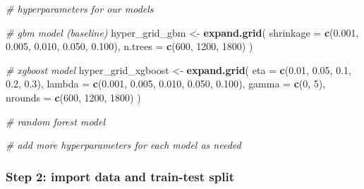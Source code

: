 \documentclass[
]{article}
\newenvironment{Shaded}{\begin{snugshade}}{\end{snugshade}}
\newcommand{\CommentTok}[1]{\textcolor[rgb]{0.56,0.35,0.01}{\textit{#1}}}
\newcommand{\DataTypeTok}[1]{\textcolor[rgb]{0.13,0.29,0.53}{#1}}
\newcommand{\DecValTok}[1]{\textcolor[rgb]{0.00,0.00,0.81}{#1}}
\newcommand{\FloatTok}[1]{\textcolor[rgb]{0.00,0.00,0.81}{#1}}
\newcommand{\KeywordTok}[1]{\textcolor[rgb]{0.13,0.29,0.53}{\textbf{#1}}}
\newcommand{\NormalTok}[1]{#1}
\newcommand{\OperatorTok}[1]{\textcolor[rgb]{0.81,0.36,0.00}{\textbf{#1}}}
\newcommand{\StringTok}[1]{\textcolor[rgb]{0.31,0.60,0.02}{#1}}
\begin{document}
\begin{Shaded}
\begin{Highlighting}[]
\CommentTok{# hyperparameters for our models }

\CommentTok{# gbm model (baseline)}
\NormalTok{hyper_grid_gbm <-}\StringTok{ }\KeywordTok{expand.grid}\NormalTok{(}
  \DataTypeTok{shrinkage =} \KeywordTok{c}\NormalTok{(}\FloatTok{0.001}\NormalTok{, }\FloatTok{0.005}\NormalTok{, }\FloatTok{0.010}\NormalTok{, }\FloatTok{0.050}\NormalTok{, }\FloatTok{0.100}\NormalTok{),}
  \DataTypeTok{n.trees =} \KeywordTok{c}\NormalTok{(}\DecValTok{600}\NormalTok{, }\DecValTok{1200}\NormalTok{, }\DecValTok{1800}\NormalTok{)}
\NormalTok{)}

\CommentTok{# xgboost model }
\NormalTok{hyper_grid_xgboost <-}\StringTok{ }\KeywordTok{expand.grid}\NormalTok{(}
  \DataTypeTok{eta =} \KeywordTok{c}\NormalTok{(}\FloatTok{0.01}\NormalTok{, }\FloatTok{0.05}\NormalTok{, }\FloatTok{0.1}\NormalTok{, }\FloatTok{0.2}\NormalTok{, }\FloatTok{0.3}\NormalTok{),}
  \DataTypeTok{lambda =} \KeywordTok{c}\NormalTok{(}\FloatTok{0.001}\NormalTok{, }\FloatTok{0.005}\NormalTok{, }\FloatTok{0.010}\NormalTok{, }\FloatTok{0.050}\NormalTok{, }\FloatTok{0.100}\NormalTok{),}
  \DataTypeTok{gamma =} \KeywordTok{c}\NormalTok{(}\DecValTok{0}\NormalTok{, }\DecValTok{5}\NormalTok{),}
  \DataTypeTok{nrounds =} \KeywordTok{c}\NormalTok{(}\DecValTok{600}\NormalTok{, }\DecValTok{1200}\NormalTok{, }\DecValTok{1800}\NormalTok{)}
\NormalTok{)}


\CommentTok{# random forest model }










\CommentTok{# add more hyperparameters for each model as needed }
\end{Highlighting}
\end{Shaded}

\hypertarget{step-2-import-data-and-train-test-split}{%
\subsubsection{Step 2: import data and train-test
split}\label{step-2-import-data-and-train-test-split}}

\begin{Shaded}
\end{Shaded}
\end{document}
